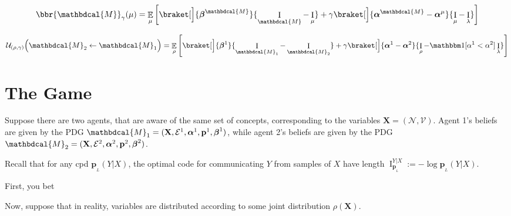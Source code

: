 \documentclass[twoside]{article} %
\theoremstyle{plain}
\theoremstyle{definition}
\DeclareMathOperator{\I}{\mathrm{I}} %
\DeclareMathOperator*{\Ex}{\mathbb{E}} %
\newcommand{\mat}[1]{\mathbf{#1}}
\newcommand{\ssub}[1]{_{\!_{#1}\!}}
\newcommand{\bp}[1][L]{\mat{p}\ssub{#1}}
\newcommand{\V}{\mathcal V}
\newcommand{\N}{\mathcal N}
\newcommand{\Ed}{\mathcal E}
\newcommand{\balpha}{\boldsymbol\alpha}
\newcommand{\bbeta}{\boldsymbol\beta}
\newcommand{\dg}[1]{\mathbdcal{#1}}
\begin{document}
    \begin{align*}
        \bbr{\dg M}_\gamma(\mu) = 
        \Ex_{\mu}\left[
            \braket[\Big]{\bbeta^{\dg M}}{\I_{\dg M}- \I_{\mu}}
            + \gamma
            \braket[\Big]{\balpha^{\dg M} - \balpha^{\mu}} {\I_\mu - \I_\lambda}
        \right]
    \end{align*}

    \[
    \mathcal U_{(\rho, \gamma)}\Big(\dg M_2 \gets \dg M_1 \Big)  = 
        \Ex_{\rho}\left[
            \braket[\Big]{\bbeta^{1}}{\I_{\dg M_1}- \I_{\dg M_2}}
            + \gamma
            \braket[\Big]{\balpha^{1} - \balpha^{2}} {\I_\rho - \mathbbm1[\alpha^1<\alpha^2]\I_\lambda}
        \right]
    \]
    
    
    \section{The Game}
    Suppose there are two agents, that are aware of the same set of concepts, corresponding to the variables $\mathbf X = (\N, \V)$. 
    Agent 1's beliefs are given by the PDG 
    $\dg M_1 = (\mat X, \Ed^1,\balpha^1, \mat p^1, \bbeta^1)$,
    while agent 2's beliefs are given by the PDG
    $\dg M_2 = (\mat X, \Ed^2,\balpha^2, \mat p^2, \bbeta^2)$.
    
    Recall that for any cpd $\bp(Y|X)$, the optimal code for communicating $Y$ from samples of $X$ have length $\I^{Y|X}_{\bp} := - \log {\bp(Y|X)}$.
    
    First, you bet
    
    Now, suppose that in reality, variables are distributed according to some joint distribution $\rho(\mathbf X)$. 
     
\end{document}
